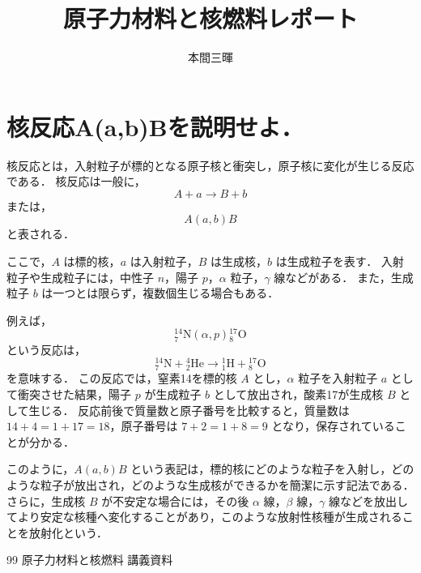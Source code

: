 \documentclass[titlepage,a4paper]{jsarticle}
\title{原子力材料と核燃料レポート}
\author{本間三暉}
\begin{document}
\maketitle
\section{核反応A(a,b)Bを説明せよ．}
核反応とは，入射粒子が標的となる原子核と衝突し，原子核に変化が生じる反応である．
核反応は一般に，
\[
A + a \rightarrow B + b
\]
または，
\[
A(a,b)B
\]
と表される．

ここで，$A$ は標的核，$a$ は入射粒子，$B$ は生成核，$b$ は生成粒子を表す．
入射粒子や生成粒子には，中性子 $n$，陽子 $p$，$\alpha$ 粒子，$\gamma$ 線などがある．
また，生成粒子 $b$ は一つとは限らず，複数個生じる場合もある．

例えば，
\[
{}^{14}_{7}\mathrm{N}(\alpha,p){}^{17}_{8}\mathrm{O}
\]
という反応は，
\[
{}^{14}_{7}\mathrm{N} + {}^{4}_{2}\mathrm{He}
\rightarrow
{}^{1}_{1}\mathrm{H} + {}^{17}_{8}\mathrm{O}
\]
を意味する．
この反応では，窒素14を標的核 $A$ とし，$\alpha$ 粒子を入射粒子 $a$ として衝突させた結果，陽子 $p$ が生成粒子 $b$ として放出され，酸素17が生成核 $B$ として生じる．
反応前後で質量数と原子番号を比較すると，質量数は $14+4=1+17=18$，原子番号は $7+2=1+8=9$ となり，保存されていることが分かる．

このように，$A(a,b)B$ という表記は，標的核にどのような粒子を入射し，どのような粒子が放出され，どのような生成核ができるかを簡潔に示す記法である．
さらに，生成核 $B$ が不安定な場合には，その後 $\alpha$ 線，$\beta$ 線，$\gamma$ 線などを放出してより安定な核種へ変化することがあり，このような放射性核種が生成されることを放射化という．

\begin{thebibliography}{99}
原子力材料と核燃料 講義資料
\end{thebibliography}
\end{document}
